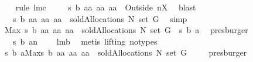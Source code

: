 \begin{isabellebody}
\ {}\ \isamarkupfalse%
\ {\isacharparenleft}rule\ lm{}{}c{\isacharparenright}\isanewline
{}\isamarkupfalse%
\ \isamarkupfalse%
\ {\isachardoublequoteopen}{\isachardot}{\isachardot}{\isachardot}\ {\isacharequal}\ {\isacharbraceleft}{\isacharquery}s\ b\ aa{\isacharbar}\ aa{\isachardot}\ aa\ {\isasymin}\ Outside{\isacharprime}\ {\isacharbraceleft}{\isacharquery}n{\isacharbraceright}{\isacharbackquote}{\isacharquery}X{\isacharbraceright}{\isachardoublequoteclose}\ \isamarkupfalse%
\ blast\isanewline
{}\isamarkupfalse%
\ \isamarkupfalse%
\ {\isachardoublequoteopen}{\isachardot}{\isachardot}{\isachardot}\ {\isacharequal}\ {\isacharbraceleft}{\isacharquery}s\ b\ aa{\isacharbar}\ aa{\isachardot}\ aa\ {\isasymin}\ soldAllocations\ N\ {\isacharparenleft}set\ G{\isacharparenright}{\isacharbraceright}{\isachardoublequoteclose}\ \isamarkupfalse%
\ simp\isanewline
{}\isamarkupfalse%
\ \isamarkupfalse%
\ {\isachardoublequoteopen}Max\ {\isacharbraceleft}{\isacharquery}s\ b\ aa{\isacharbar}\ aa{\isachardot}\ aa\ {\isasymin}\ soldAllocations\ N\ {\isacharparenleft}set\ G{\isacharparenright}{\isacharbraceright}\ {\isacharequal}\ {\isacharquery}s\ b\ a{\isachardoublequoteclose}\ \isamarkupfalse%
\ presburger\isanewline
{}\isamarkupfalse%
\ \isamarkupfalse%
\ {\isachardoublequoteopen}{\isachardot}{\isachardot}{\isachardot}\ {\isacharequal}\ {\isacharquery}s\ b\ {\isacharparenleft}a{\isacharminus}{\isacharminus}{\isacharquery}n{\isacharparenright}{\isachardoublequoteclose}\ \isamarkupfalse%
\ {}\ {}\ lm{}{}b\ \isamarkupfalse%
\ {\isacharparenleft}metis\ {\isacharparenleft}lifting{\isacharcomma}\ no{\isacharunderscore}types{\isacharparenright}{\isacharparenright}\isanewline
{}\isamarkupfalse%
\ \isamarkupfalse%
\ {\isachardoublequoteopen}{\isacharquery}s\ b\ {\isacharquery}a{\isacharequal}Max{\isacharbraceleft}{\isacharquery}s\ b\ aa{\isacharbar}\ aa{\isachardot}\ aa\ {\isasymin}\ soldAllocations\ N\ {\isacharparenleft}set\ G{\isacharparenright}{\isacharbraceright}{\isachardoublequoteclose}\ \isamarkupfalse%
\ {}\ \isamarkupfalse%
\ presburger\isanewline
{}\isamarkupfalse%
%
\endisatagproof
{\isafoldproof}%
%
\isadelimproof
%
\endisadelimproof
%
\begin{isamarkuptext}%

\end{isamarkuptext}
\end{isabellebody}
